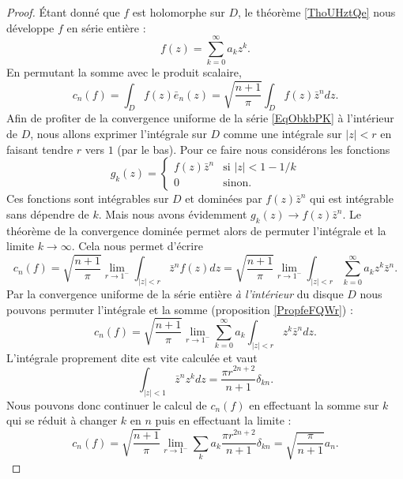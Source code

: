 \begin{proof}
    Étant donné que \( f\) est holomorphe sur \( D\), le théorème \ref{ThoUHztQe} nous développe \( f\) en série entière :
    \begin{equation}    \label{EqObkbPK}
        f(z)=\sum_{k=0}^{\infty}a_kz^k.
    \end{equation}
    En permutant la somme avec le produit scalaire,
    \begin{equation}
        c_n(f)=\int_Df(z)\bar e_n(z)=\sqrt{\frac{ n+1 }{ \pi }}\int_Df(z)\bar z^ndz.
    \end{equation}
    Afin de profiter de la convergence uniforme de la série \eqref{EqObkbPK} à l'intérieur de \( D\), nous allons exprimer l'intégrale sur \( D\) comme une intégrale sur \( | z |<r\) en faisant tendre \( r\) vers \( 1\) (par le bas). Pour ce faire nous considérons les fonctions
    \begin{equation}
        g_k(z)=\begin{cases}
            f(z)\bar z^n    &   \text{si } | z |<1-1/k\\
            0    &    \text{sinon.}
        \end{cases}
    \end{equation}
    Ces fonctions sont intégrables sur \( D\) et dominées par \( f(z)\bar z^n\) qui est intégrable sans dépendre de \( k\). Mais nous avons évidemment \( g_k(z)\to f(z)\bar z^n\). Le théorème de la convergence dominée permet alors de permuter l'intégrale et la limite \( k\to \infty\). Cela nous permet d'écrire
    \begin{equation}
        c_n(f)=\sqrt{\frac{ n+1 }{ \pi }}\lim_{r\to 1^-}\int_{| z |<r}\bar z^nf(z)dz=\sqrt{\frac{ n+1 }{ \pi }}\lim_{r\to 1^-}\int_{| z |<r}\sum_{k=0}^{\infty}a_kz^k\bar z^n.
    \end{equation}
    Par la convergence uniforme de la série entière \emph{à l'intérieur} du disque \( D\) nous pouvons permuter l'intégrale et la somme (proposition \ref{PropfeFQWr}) :
    \begin{equation}
        c_n(f)=\sqrt{\frac{ n+1 }{ \pi }}\lim_{r\to 1^-}\sum_{k=0}^{\infty}a_k\int_{| z |<r}z^k\bar z^ndz.
    \end{equation}
    L'intégrale proprement dite est vite calculée et vaut
    \begin{equation}
        \int_{| z |<1}\bar z^nz^kdz=\frac{ \pi r^{2n+2} }{ n+1 }\delta_{kn}.
    \end{equation}
    Nous pouvons donc continuer le calcul de \( c_n(f)\) en effectuant la somme sur \( k\) qui se réduit à changer \( k\) en \( n\) puis en effectuant la limite :
    \begin{equation}
        c_n(f)=\sqrt{\frac{ n+1 }{ \pi }}\lim_{r\to 1^-}\sum_ka_k\frac{ \pi r^{2n+2} }{ n+1 }\delta_{kn}=\sqrt{\frac{ \pi }{ n+1 }}a_n.
    \end{equation}
    

\end{proof}
